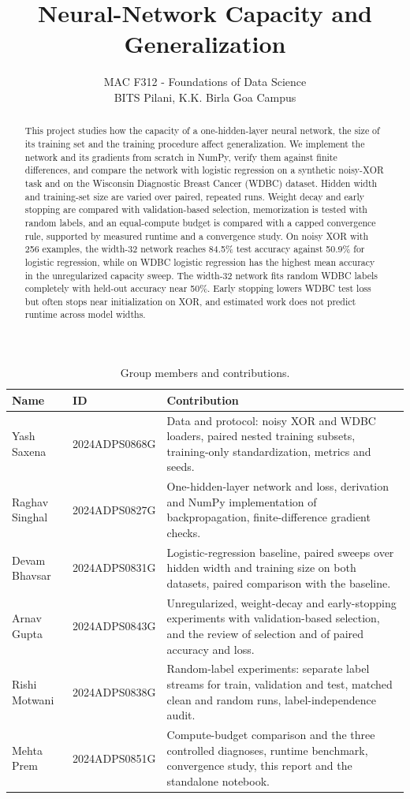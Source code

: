 \documentclass[11pt]{article}
\title{Neural-Network Capacity and Generalization}
\author{MAC F312 - Foundations of Data Science\\
BITS Pilani, K.K. Birla Goa Campus}
\date{}
\begin{document}
\maketitle

\begin{table}[H]
\centering
\small
\begin{tabular}{@{}l l >{\raggedright\arraybackslash}p{9.4cm}@{}}
\toprule
Name & ID & Contribution \\
\midrule
Yash Saxena & 2024ADPS0868G & Data and protocol: noisy XOR and WDBC loaders, paired nested training subsets, training-only standardization, metrics and seeds. \\
Raghav Singhal & 2024ADPS0827G & One-hidden-layer network and loss, derivation and NumPy implementation of backpropagation, finite-difference gradient checks. \\
Devam Bhavsar & 2024ADPS0831G & Logistic-regression baseline, paired sweeps over hidden width and training size on both datasets, paired comparison with the baseline. \\
Arnav Gupta & 2024ADPS0843G & Unregularized, weight-decay and early-stopping experiments with validation-based selection, and the review of selection and of paired accuracy and loss. \\
Rishi Motwani & 2024ADPS0838G & Random-label experiments: separate label streams for train, validation and test, matched clean and random runs, label-independence audit. \\
Mehta Prem & 2024ADPS0851G & Compute-budget comparison and the three controlled diagnoses, runtime benchmark, convergence study, this report and the standalone notebook. \\
\bottomrule
\end{tabular}
\caption{Group members and contributions.}
\end{table}

\begin{abstract}
\noindent This project studies how the capacity of a one-hidden-layer neural network, the size of its training set and the training procedure affect generalization. We implement the network and its gradients from scratch in NumPy, verify them against finite differences, and compare the network with logistic regression on a synthetic noisy-XOR task and on the Wisconsin Diagnostic Breast Cancer (WDBC) dataset. Hidden width and training-set size are varied over paired, repeated runs. Weight decay and early stopping are compared with validation-based selection, memorization is tested with random labels, and an equal-compute budget is compared with a capped convergence rule, supported by measured runtime and a convergence study. On noisy XOR with 256 examples, the width-32 network reaches 84.5\% test accuracy against 50.9\% for logistic regression, while on WDBC logistic regression has the highest mean accuracy in the unregularized capacity sweep. The width-32 network fits random WDBC labels completely with held-out accuracy near 50\%. Early stopping lowers WDBC test loss but often stops near initialization on XOR, and estimated work does not predict runtime across model widths.
\end{abstract}
\end{document}
